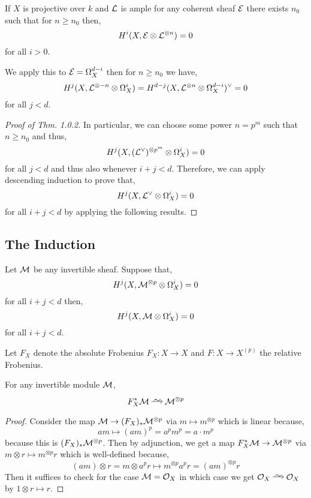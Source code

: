 \documentclass[12pt]{article}
\begin{document}
\begin{thm}
If $X$ is projective over $k$ and $\mathcal{L}$ is ample for any coherent sheaf $\mathcal{E}$ there exists $n_0$ such that for $n \ge n_0$ then,
\[ H^i(X, \mathcal{E} \otimes \mathcal{L}^{\otimes n}) = 0 \]
for all $i > 0$.
\end{thm}

\begin{rmk}
We apply this to $\mathcal{E} = \Omega_X^{d-i}$ then for $n \ge n_0$ we have,
\[ H^{j}(X, \mathcal{L}^{\otimes -n} \otimes \Omega_X^{i}) = H^{d-j}(X, \mathcal{L}^{\otimes n} \otimes \Omega_X^{d-i})^\vee = 0 \]
for all $j < d$.
\end{rmk}

\begin{proof}[Proof of Thm. 1.0.2]
In particular, we can choose some power $n = p^m$ such that $n \ge n_0$ and thus,
\[ H^j(X, (\mathcal{L}^\vee)^{\otimes p^m} \otimes \Omega^i_X) = 0 \]
for all $j < d$ and thus also whenever $i + j < d$. Therefore, we can apply descending induction to prove that,
\[ H^j(X, \mathcal{L}^\vee \otimes \Omega^i_X) = 0 \]
for all $i + j < d$ by applying the following results.
\end{proof}

\subsection{The Induction}

\begin{prop}
Let $\mathcal{M}$ be any invertible sheaf. Suppose that,
\[ H^j(X, \mathcal{M}^{\otimes p} \otimes \Omega^i_X) = 0 \] 
for all $i + j < d$ then,
\[ H^j(X, \mathcal{M} \otimes \Omega^i_X) = 0 \]
for all $i + j < d$.
\end{prop}

\begin{rmk}
Let $F_X$ denote the absolute Frobenius $F_X : X \to X$ and $F : X \to X^{(p)}$ the relative Frobenius.
\end{rmk}

\begin{lemma}
For any invertible module $\mathcal{M}$,
\[ F_X^* \M \iso \M^{\otimes p} \]
\end{lemma}

\begin{proof}
Consider the map $\mathcal{M} \to (F_X)_* \mathcal{M}^{\otimes p}$ via $m \mapsto m^{\otimes p}$ which is linear because,
\[ am \mapsto (am)^p = a^p m^p = a \cdot m^p \]
because this is $(F_X)_* \mathcal{M}^{\otimes p}$. Then by adjunction, we get a map $F_X^* \mathcal{M} \to \mathcal{M}^{\otimes p}$ via $m \otimes r \mapsto m^{\otimes p} r$ which is well-defined because,
\[ (am) \otimes r = m \otimes a^p r \mapsto m^{\otimes p} a^p r = (am)^{\otimes p} r  \] 
Then it suffices to check for the case $\mathcal{M} = \mathcal{O}_{X}$ in which case we get $\struct{X} \iso \struct{X}$ by $1 \otimes r \mapsto r$.
\end{proof}
\end{document}
